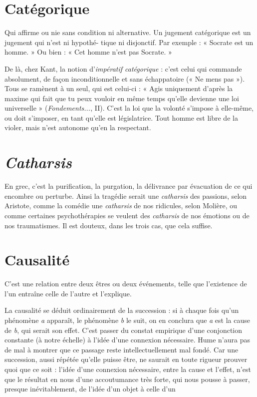 \section{Catégorique}
Qui affirme ou nie sans condition ni alternative. Un jugement
catégorique est un jugement qui n’est ni hypothé-
tique ni disjonctif. Par exemple : « Socrate est un homme. » Ou bien : « Cet
homme n’est pas Socrate. »

De là, chez Kant, la notion d’{\it impératif catégorique} : c'est celui qui commande
absolument, de façon inconditionnelle et sans échappatoire (« Ne mens
pas »). Tous se ramènent à un seul, qui est celui-ci : « Agis uniquement d’après
la maxime qui fait que tu peux vouloir en même temps qu’elle devienne une loi
universelle » ({\it Fondements...}, II). C’est la loi que la volonté s’impose à elle-même,
ou doit s'imposer, en tant qu’elle est législatrice. Tout homme est libre
de la violer, mais n’est autonome qu’en la respectant.

\section{\it Catharsis}
En grec, c’est la purification, la purgation, la délivrance par
évacuation de ce qui encombre ou perturbe. Ainsi la tragédie
serait une {\it catharsis} des passions, selon Aristote, comme la comédie une {\it catharsis}
de nos ridicules, selon Molière, ou comme certaines psychothérapies se veulent
des {\it catharsis} de nos émotions ou de nos traumatismes. Il est douteux, dans les
trois cas, que cela suffise.

\section{Causalité}
C’est une relation entre deux êtres ou deux événements, telle
que l'existence de l’un entraîne celle de l’autre et l'explique.

La causalité se déduit ordinairement de la succession : si à chaque fois
qu’un phénomène {\it a} apparaît, le phénomène {\it b} le suit, on en conclura que {\it a} est
la cause de {\it b}, qui serait son effet. C’est passer du constat empirique d’une
conjonction constante (à notre échelle) à l’idée d’une connexion nécessaire.
Hume n’aura pas de mal à montrer que ce passage reste intellectuellement mal
fondé. Car une succession, aussi répétée qu’elle puisse être, ne saurait en toute
rigueur prouver quoi que ce soit : l’idée d’une connexion nécessaire, entre la
cause et l’effet, n’est que le résultat en nous d’une accoutumance très forte, qui
nous pousse à passer, presque inévitablement, de l’idée d’un objet à celle d’un

